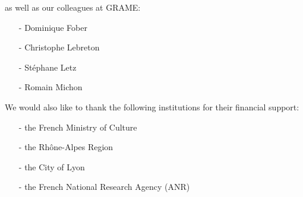 as well as our colleagues at GRAME:
\begin{itemize}
\setlength\itemsep{0em}
\item[-]Dominique Fober
\item[-]Christophe Lebreton
\item[-]St\'ephane Letz
\item[-]Romain Michon
\end{itemize}

We would also like to thank the following institutions for their financial support:
\begin{itemize}
\setlength\itemsep{0em}
\item[-]the French Ministry of Culture
\item[-]the Rh\^one-Alpes Region
\item[-]the City of Lyon
\item[-]the French National Research Agency (\textsc{ANR})
\end{itemize}

